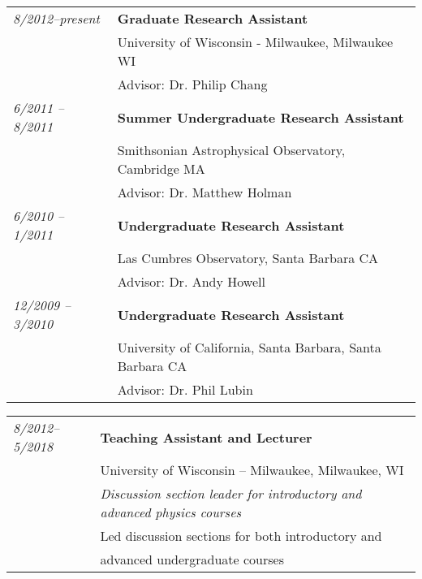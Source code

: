 \documentclass[12pt,notitlepage]{report}
\begin{document}
\bigskip
{}
\medskip

\begin{tabular}{ll}
{\it 8/2012--present} & {\bf Graduate Research Assistant} \\
				& University of Wisconsin - Milwaukee, Milwaukee WI \\
				& Advisor: Dr. Philip Chang \\

{\it 6/2011 -- 8/2011} & {\bf Summer Undergraduate Research Assistant} \\ 
                              & Smithsonian Astrophysical Observatory, Cambridge MA \\
                              & Advisor: Dr. Matthew Holman \\
{\it 6/2010 -- 1/2011} & {\bf Undergraduate Research Assistant} \\
                              & Las Cumbres Observatory, Santa Barbara CA \\
                              & Advisor: Dr. Andy Howell \\
{\it 12/2009 -- 3/2010} & {\bf Undergraduate Research Assistant} \\  
                              & University of California, Santa Barbara, Santa Barbara CA \\
                              & Advisor: Dr. Phil Lubin \\

\end{tabular}	        



\newpage
			        				
\bigskip
{}
\medskip

\begin{tabular}{ll}
{\it 8/2012--5/2018} & {\bf Teaching Assistant and Lecturer}\\		
				& University of Wisconsin -- Milwaukee, Milwaukee, WI \\
				& {\it Discussion section leader for introductory and advanced physics courses} \\
				& Led discussion sections for both introductory and \\
                                & advanced undergraduate courses \\
			        				
\end{tabular}

%
\bigskip
{}
\medskip
\end{document}
